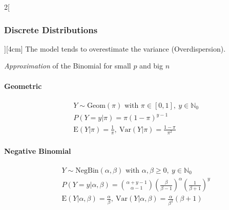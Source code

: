 \documentclass[8pt]{extarticle}
\begin{document}
\begin{multicols}{2}[\subsubsection{Discrete Distributions}][4cm]
\noindent The model tends to overestimate the variance (Overdispersion).
  
\noindent   \textit{Approximation} of the Binomial for small $p$ and big $n$

  
    \paragraph{Geometric}

  \begin{align*}
    & Y \sim \mathrm{Geom}(\pi) \text{ with } \pi \in \left[0,1\right] ,\: y \in \mathbb{N}_0 \\
    & P(Y=y|\pi) = \pi(1-\pi)^{y-1} \\
    & \mathrm{E}(Y|\pi) = \frac{1}{\pi} ,\: \mathrm{Var}(Y|\pi) = \frac{1-\pi}{\pi^2}
  \end{align*}
  
    \paragraph{Negative Binomial}

  \begin{align*}
    & Y \sim \mathrm{NegBin}(\alpha, \beta) \text{ with } \alpha, \beta \geq 0 ,\: y \in \mathbb{N}_0 \\
    & P(Y=y|\alpha, \beta) = \binom{\alpha + y - 1}{\alpha - 1} \left(\frac{\beta}{\beta - 1}\right)^{\alpha} \left(\frac{1}{\beta + 1}\right)^y \\
    & \mathrm{E}(Y|\alpha,\beta) = \frac{\alpha}{\beta} ,\: \mathrm{Var}(Y|\alpha,\beta) = \frac{\alpha}{\beta^2}(\beta+1)
  \end{align*}

\end{multicols}
\end{document}
